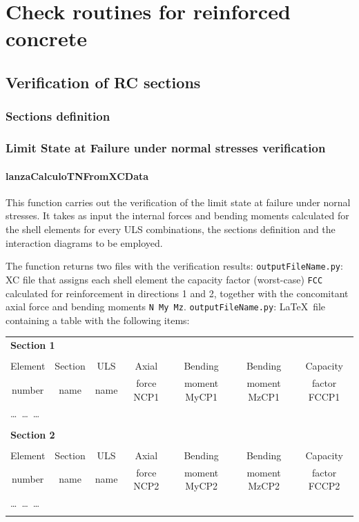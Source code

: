 \section{Check routines for reinforced concrete}

\subsection{Verification of RC sections}

\subsubsection{Sections definition}



\subsubsection{Limit State at Failure under normal stresses verification}

\paragraph{lanzaCalculoTNFromXCData}
This function carries out the verification of the limit state at failure under nornal stresses. It takes as input the internal forces and bending moments calculated for the shell elements for every ULS combinations, the sections definition and the interaction diagrams to be employed.

The function returns two files with the verification results:
{\tt outputFileName.py}: XC file that assigns each shell element the capacity factor (worst-case) {\tt FCC} calculated for reinforcement in directions 1 and 2, together with the concomitant axial force and bending moments {\tt N My Mz}.
{\tt outputFileName.py}: \LaTeX\  file containing a table with the following items:

\begin{center}
\begin{tabular}{ccccccc}
\multicolumn{7}{l}{\textbf{Section 1}} \\
\\
Element & Section & ULS & Axial & Bending & Bending & Capacity \\
number  & name & name & force NCP1 & moment MyCP1 & moment MzCP1 & factor FCCP1 \\
\hline
\multicolumn{7}{l}{\ldots\ \ldots\ \ldots} \\
\\
\multicolumn{7}{l}{\textbf{Section 2}} \\
\\
Element & Section & ULS & Axial & Bending & Bending & Capacity \\
number  & name & name & force NCP2 & moment MyCP2 & moment MzCP2 & factor FCCP2 \\
\hline
\multicolumn{7}{l}{\ldots\ \ldots\ \ldots} \\
\\

\end{tabular}
\end{center}

